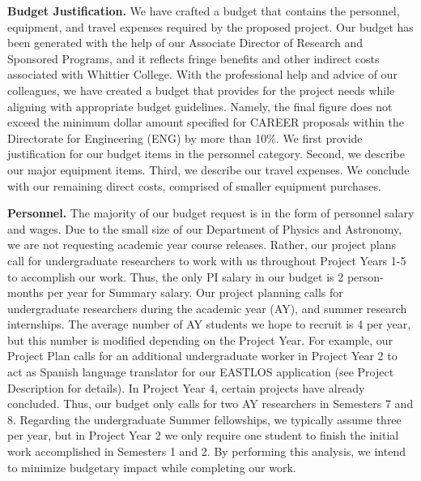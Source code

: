 \documentclass[../../main.tex]{subfiles}
\begin{document}
\label{sec:budget_just}

\textbf{Budget Justification.}  We have crafted a budget that contains the personnel, equipment, and travel expenses required by the proposed project.  Our budget has been generated with the help of our Associate Director of Research and Sponsored Programs, and it reflects fringe benefits and other indirect costs associated with Whittier College.  With the professional help and advice of our colleagues, we have created a budget that provides for the project needs while aligning with appropriate budget guidelines.  Namely, the final figure does not exceed the minimum dollar amount specified for CAREER proposals within the Directorate for Engineering (ENG) by more than 10\%.  We first provide justification for our budget items in the personnel category.  Second, we describe our major equipment items.  Third, we describe our travel expenses.  We conclude with our remaining direct costs, comprised of smaller equipment purchases.  \\ \vspace{2.5mm}

\textbf{Personnel.}  The majority of our budget request is in the form of personnel salary and wages.  Due to the small size of our Department of Physics and Astronomy, we are not requesting academic year course releases.  Rather, our project plans call for undergraduate researchers to work with us throughout Project Years 1-5 to accomplish our work.  Thus, the only PI salary in our budget is 2 person-months per year for Summary salary.  Our project planning calls for undergraduate researchers during the academic year (AY), and summer research internships.  The average number of AY students we hope to recruit is 4 per year, but this number is modified depending on the Project Year.  For example, our Project Plan calls for an additional undergraduate worker in Project Year 2 to act as Spanish language translator for our EASTLOS application (see Project Description for details).  In Project Year 4, certain projects have already concluded.  Thus, our budget only calls for two AY researchers in Semesters 7 and 8.  Regarding the undergraduate Summer fellowships, we typically assume three per year, but in Project Year 2 we only require one student to finish the initial work accomplished in Semesters 1 and 2.  By performing this analysis, we intend to minimize budgetary impact while completing our work. \\ \vspace{2.5mm}
\end{document}
